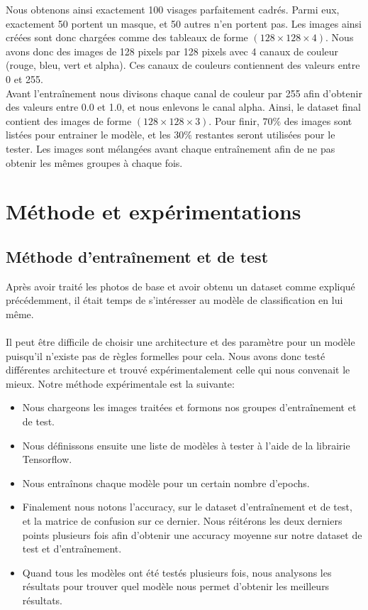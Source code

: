 \documentclass{article}
\begin{document}
Nous obtenons ainsi exactement 100 visages parfaitement cadrés. Parmi eux, exactement 50 portent un masque, et 50 autres n'en portent pas. Les images ainsi créées sont donc chargées comme des tableaux de forme $(128\times128\times4)$. Nous avons donc des images de 128 pixels par 128 pixels avec 4 canaux de couleur (rouge, bleu, vert et alpha). Ces canaux de couleurs contiennent des valeurs entre 0 et 255.\\
Avant l'entraînement nous divisons chaque canal de couleur par 255 afin d'obtenir des valeurs entre 0.0 et 1.0, et nous enlevons le canal alpha. Ainsi, le dataset final contient des images de forme $(128\times128\times3)$. Pour finir, $70\%$ des images sont listées pour entrainer le modèle, et les $30\%$ restantes seront utilisées pour le tester. Les images sont mélangées avant chaque entraînement afin de ne pas obtenir les mêmes groupes à chaque fois.

\section{Méthode et expérimentations}
\subsection{Méthode d'entraînement et de test}
Après avoir traité les photos de base et avoir obtenu un dataset comme expliqué précédemment, il était temps de s'intéresser au modèle de classification en lui même.\\\\

Il peut être difficile de choisir une architecture et des paramètre pour un modèle puisqu'il n'existe pas de règles formelles pour cela. Nous avons donc testé différentes architecture et trouvé expérimentalement celle qui nous convenait le mieux. Notre méthode expérimentale est la suivante:
\begin{itemize}
  \item Nous chargeons les images traitées et formons nos groupes d'entraînement et de test.
  \item Nous définissons ensuite une liste de modèles à tester à l'aide de la librairie Tensorflow.
  \item Nous entraînons chaque modèle pour un certain nombre d'epochs.
  \item Finalement nous notons l'accuracy, sur le dataset d'entraînement et de test, et la matrice de confusion sur ce dernier. Nous réitérons les deux derniers points plusieurs fois afin d'obtenir une accuracy moyenne sur notre dataset de test et d'entraînement.
  \item Quand tous les modèles ont été testés plusieurs fois, nous analysons les résultats pour trouver quel modèle nous permet d'obtenir les meilleurs résultats.\\
\end{itemize}
\end{document}
